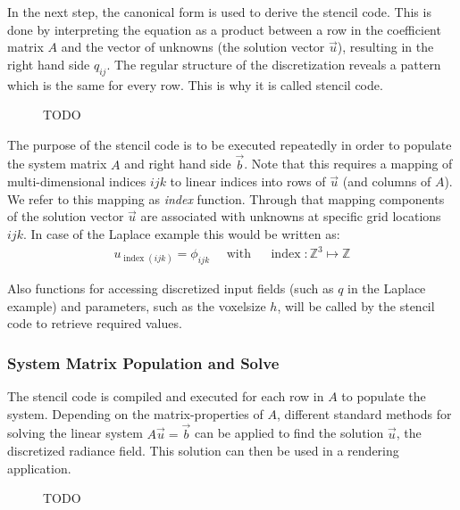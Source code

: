 In the next step, the canonical form is used to derive the stencil code. This is done by interpreting the equation as a product between a row in the coefficient matrix $A$ and the vector of unknowns (the solution vector $\vec{u}$), resulting in the right hand side $q_{ij}$. The regular structure of the discretization reveals a pattern which is the same for every row. This is why it is called stencil code.
\begin{figure}[h]
\centering
{}
\caption{TODO}
\label{fig:pn_solver_stencil_code}
\end{figure}

The purpose of the stencil code is to be executed repeatedly in order to populate the system matrix $A$ and right hand side $\vec{b}$. Note that this requires a mapping of multi-dimensional indices $ijk$ to linear indices into rows of $\vec{u}$ (and columns of $A$). We refer to this mapping as \emph{index} function. Through that mapping components of the solution vector $\vec{u}$ are associated with unknowns at specific grid locations $ijk$. In case of the Laplace example this would be written as:
\begin{align}
u_{\operatorname{index}\left(ijk\right)} = \phi_{ijk}\quad\text{ with }\quad \operatorname{index}: \mathbb{Z}^3\mapsto\mathbb{Z}
\label{eq:pn_index_mapping}
\end{align}

Also functions for accessing discretized input fields (such as $q$ in the Laplace example) and parameters, such as the voxelsize $h$, will be called by the stencil code to retrieve required values.

\subsubsection*{System Matrix Population and Solve}
The stencil code is compiled and executed for each row in $A$ to populate the system. Depending on the matrix-properties of $A$, different standard methods for solving the linear system $A\vec{u}=\vec{b}$ can be applied to find the solution $\vec{u}$, the discretized radiance field. This solution can then be used in a rendering application.
\begin{figure}[h]
\centering
{}
\caption{TODO}
\label{fig:pn_solver_stencil_overview}
\end{figure}


